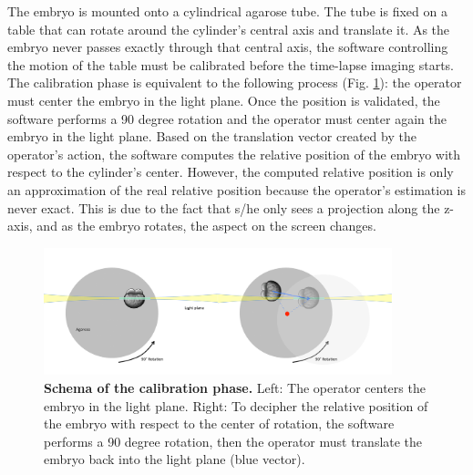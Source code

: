    The embryo is mounted onto a cylindrical agarose tube. The tube is fixed on a table that can rotate around the cylinder's central axis and translate it. As the embryo never passes exactly through that central axis, the software controlling the motion of the table must be calibrated before the time-lapse imaging starts. The calibration phase is equivalent to the following process (Fig. \ref{washington_manual_spim}): the operator must center the embryo in the light plane. Once the position is validated, the software performs a 90 degree rotation and the operator must center again the embryo in the light plane. Based on the translation vector created by the operator's action, the software computes the relative position of the embryo with respect to the cylinder's center. However, the computed relative position is only an approximation of the real relative position because the operator's estimation is never exact. This is due to the fact that s/he only sees a projection along the z-axis, and as the embryo rotates, the aspect on the screen changes.  
\begin{figure}
\begin{center}
\includegraphics[width=0.9\textwidth]{../../images/Reconstruction/washington/manual_spim.png}
\end{center}
\caption{\textbf{Schema of the calibration phase. } Left: The operator centers the embryo in the light plane. Right: To decipher the relative position of the embryo with respect to the center of rotation, the software performs a 90 degree rotation, then the operator must translate the embryo back into the light plane (blue vector). }
\label{washington_manual_spim}
\end{figure}

